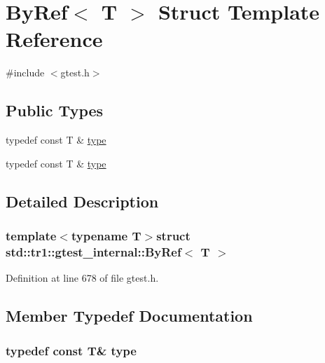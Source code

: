 \hypertarget{structstd_1_1tr1_1_1gtest__internal_1_1ByRef}{\section{\-By\-Ref$<$ \-T $>$ \-Struct \-Template \-Reference}
\label{d1/d1d/structstd_1_1tr1_1_1gtest__internal_1_1ByRef}
}


{\ttfamily \#include $<$gtest.\-h$>$}

\subsection*{\-Public \-Types}
\begin{DoxyCompactItemize}
\item 
typedef const \-T \& \hyperlink{structstd_1_1tr1_1_1gtest__internal_1_1ByRef_adc53121e54ca020c126cd642b99b6288}{type}
\item 
typedef const \-T \& \hyperlink{structstd_1_1tr1_1_1gtest__internal_1_1ByRef_adc53121e54ca020c126cd642b99b6288}{type}
\end{DoxyCompactItemize}


\subsection{\-Detailed \-Description}
\subsubsection*{template$<$typename T$>$struct std\-::tr1\-::gtest\-\_\-internal\-::\-By\-Ref$<$ T $>$}



\-Definition at line 678 of file gtest.\-h.



\subsection{\-Member \-Typedef \-Documentation}
\hypertarget{structstd_1_1tr1_1_1gtest__internal_1_1ByRef_adc53121e54ca020c126cd642b99b6288}{
\subsubsection[{type}]{\setlength{\rightskip}{0pt plus 5cm}typedef const \-T\& {\bf type}}}\label{d1/d1d/structstd_1_1tr1_1_1gtest__internal_1_1ByRef_adc53121e54ca020c126cd642b99b6288}


